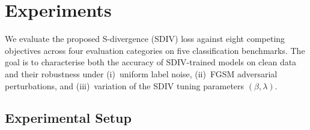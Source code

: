 %
%
%
%

\section{Experiments}
\label{sec:experiments}

We evaluate the proposed S-divergence (SDIV) loss against eight competing
objectives across four evaluation categories on five classification benchmarks.
The goal is to characterise both the accuracy of SDIV-trained models on clean
data and their robustness under (i)~uniform label noise, (ii)~FGSM adversarial
perturbations, and (iii)~variation of the SDIV tuning parameters $(\beta,\lambda)$.

\subsection{Experimental Setup}
\label{sec:setup}

